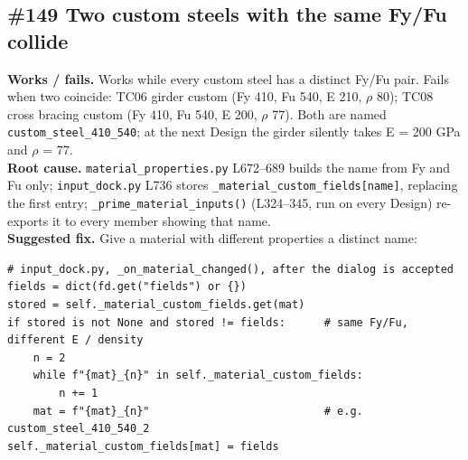 \documentclass[11pt,a4paper]{article}
\newcommand{\src}[1]{\texttt{#1}}
\begin{document}
\subsection{\#149 Two custom steels with the same Fy/Fu collide}
\textbf{Works / fails.} Works while every custom steel has a distinct Fy/Fu pair. Fails when two coincide: TC06 girder custom
(Fy 410, Fu 540, E 210, $\rho$ 80); TC08 cross bracing custom (Fy 410, Fu 540, E 200, $\rho$ 77). Both are named
\texttt{custom\_steel\_410\_540}; at the next Design the girder silently takes E = 200 GPa and $\rho$ = 77.\\
\textbf{Root cause.} \src{material\_properties.py} L672--689 builds the name from Fy and Fu only; \src{input\_dock.py} L736
stores \texttt{\_material\_custom\_fields[name]}, replacing the first entry; \texttt{\_prime\_material\_inputs()} (L324--345, run
on every Design) re-exports it to every member showing that name.\\
\textbf{Suggested fix.} Give a material with different properties a distinct name:
\begin{Verbatim}[frame=single,framesep=5pt,fontsize=\footnotesize,samepage=true]
# input_dock.py, _on_material_changed(), after the dialog is accepted
fields = dict(fd.get("fields") or {})
stored = self._material_custom_fields.get(mat)
if stored is not None and stored != fields:      # same Fy/Fu, different E / density
    n = 2
    while f"{mat}_{n}" in self._material_custom_fields:
        n += 1
    mat = f"{mat}_{n}"                           # e.g. custom_steel_410_540_2
self._material_custom_fields[mat] = fields
\end{Verbatim}
\end{document}
